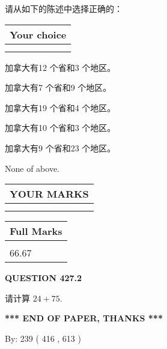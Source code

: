 \documentclass{ctexart}
\begin{document}
  
请从如下的陈述中选择正确的：
  
  
\noindent\hspace{3.0in} \begin{tabular}{|l|}
\hline
Your choice \\
\hline
 \\ 
 \\ 
\hline
\end{tabular}
  
  
 
 
加拿大有12 个省和3 个地区。
 
 
加拿大有7 个省和9 个地区。
 
 
加拿大有19 个省和4 个地区。
 
 
加拿大有10 个省和3 个地区。
 
 
加拿大有9 个省和23 个地区。
 
 
 None of above.
 
 
  
\vspace{0.2in}
  
\noindent\begin{tabular}{|l|}
\hline
 YOUR MARKS  \\
\hline
 \\ 
 \\ 
\hline
\end{tabular}
\hspace{0.05in} \begin{tabular}{|l|}
\hline
 Full Marks  \\
\hline
 \\ 
66.67 \\
\hline
\end{tabular}
{\textbf{\Large{QUESTION
427.2 
}}}
  
  
 
请计算 $ %
24 +  %
75 $.
 

 

 
   
   
 \vspace{0.2in}
 
   
   
   
   
\vspace{1.0in} 
{\textbf{\large{ *** END OF PAPER, THANKS *** }}} 
   
   
\hspace{1.0in} By: 
 239 ( 416 ,  613 )
   
\end{document}
